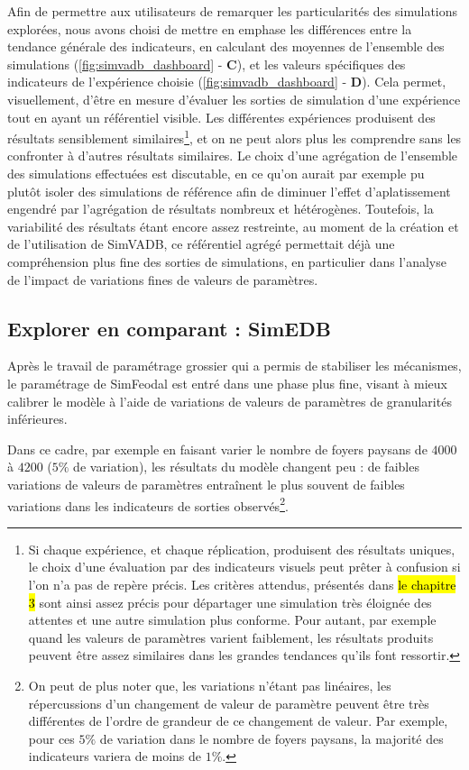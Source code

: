 	Afin de permettre aux utilisateurs de remarquer les particularités des simulations explorées, nous avons choisi de mettre en emphase les différences entre la tendance générale des indicateurs, en calculant des moyennes de l'ensemble des simulations (\cref{fig:simvadb_dashboard} - \textbf{C}), et les valeurs spécifiques des indicateurs de l'expérience choisie (\cref{fig:simvadb_dashboard} - \textbf{D}).
	Cela permet, visuellement, d'être en mesure d'évaluer les sorties de simulation d'une expérience tout en ayant un référentiel visible.
	Les différentes expériences produisent des résultats sensiblement similaires\footnote{
		Si chaque expérience, et chaque réplication, produisent des résultats uniques, le choix d'une évaluation par des indicateurs visuels peut prêter à confusion si l'on n'a pas de repère précis.
		Les critères attendus, présentés dans \hl{le chapitre 3} sont ainsi assez précis pour départager une simulation très éloignée des attentes et une autre simulation plus conforme.
		Pour autant, par exemple quand les valeurs de paramètres varient faiblement, les résultats produits peuvent être assez similaires dans les grandes tendances qu'ils font ressortir.

	}, et on ne peut alors plus les comprendre sans les confronter à d'autres résultats similaires.
	Le choix d'une agrégation de l'ensemble des simulations effectuées est discutable, en ce qu'on aurait par exemple pu plutôt isoler des simulations \og de référence \fg{} afin de diminuer l'effet \og d’aplatissement \fg{} engendré par l'agrégation de résultats nombreux et hétérogènes.
	Toutefois, la variabilité des résultats étant encore assez restreinte, au moment de la création et de l'utilisation de SimVADB, ce référentiel agrégé permettait déjà une compréhension plus fine des sorties de simulations, en particulier dans l'analyse de l'impact de variations fines de valeurs de paramètres.

	\subsection{Explorer en comparant : SimEDB}

	Après le travail de paramétrage grossier qui a permis de stabiliser les mécanismes, le paramétrage de SimFeodal est entré dans une phase plus fine, visant à mieux calibrer le modèle à l'aide de variations de valeurs de paramètres de granularités inférieures.

	Dans ce cadre, par exemple en faisant varier le nombre de foyers paysans de $4000$ à $4200$ ($5\%$ de variation), les résultats du modèle changent peu :  de faibles variations de valeurs de paramètres entraînent le plus souvent de faibles variations dans les indicateurs de sorties observés\footnote{
	On peut de plus noter que, les variations n'étant pas linéaires, les répercussions d'un changement de valeur de paramètre peuvent être très différentes de l'ordre de grandeur de ce changement de valeur. Par exemple, pour ces $5\%$ de variation dans le nombre de foyers paysans, la majorité des indicateurs variera de moins de $1\%$.
	}.


